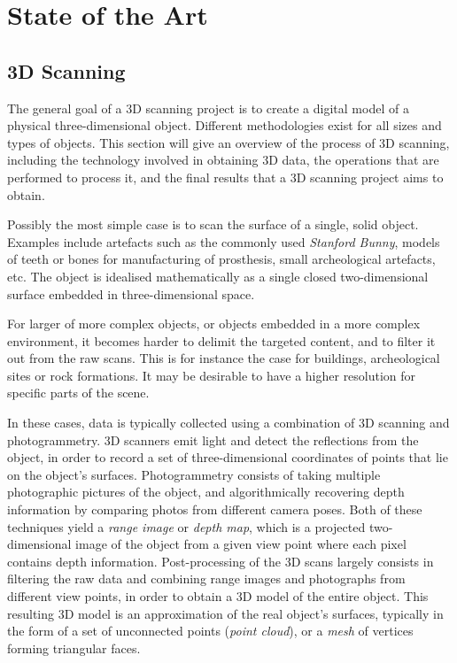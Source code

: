 \chapter{State of the Art}

\section{3D Scanning}
The general goal of a 3D scanning project is to create a digital model of a physical three-dimensional object. Different methodologies exist for all sizes and types of objects. This section will give an overview of the process of 3D scanning, including the technology involved in obtaining 3D data, the operations that are performed to process it, and the final results that a 3D scanning project aims to obtain.

Possibly the most simple case is to scan the surface of a single, solid object. Examples include artefacts such as the commonly used \emph{Stanford Bunny}, models of teeth or bones for manufacturing of prosthesis, small archeological artefacts, etc. The object is idealised mathematically as a single closed two-dimensional surface embedded in three-dimensional space.

For larger of more complex objects, or objects embedded in a more complex environment, it becomes harder to delimit the targeted content, and to filter it out from the raw scans. This is for instance the case for buildings, archeological sites or rock formations. It may be desirable to have a higher resolution for specific parts of the scene.

In these cases, data is typically collected using a combination of 3D scanning and photogrammetry. 3D scanners emit light and detect the reflections from the object, in order to record a set of three-dimensional coordinates of points that lie on the object's surfaces. Photogrammetry consists of taking multiple photographic pictures of the object, and algorithmically recovering depth information by comparing photos from different camera poses. Both of these techniques yield a \emph{range image} or \emph{depth map}, which is a projected two-dimensional image of the object from a given view point where each pixel contains depth information. Post-processing of the 3D scans largely consists in filtering the raw data and combining range images and photographs from different view points, in order to obtain a 3D model of the entire object. This resulting 3D model is an approximation of the real object's surfaces, typically in the form of a set of unconnected points (\emph{point cloud}), or a \emph{mesh} of vertices forming triangular faces.


